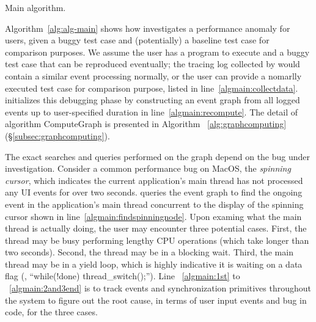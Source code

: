 \begin{algorithm}[ht!]
    \caption{Main \xxx algorithm.}
    \label{alg:alg-main}
\begin{algorithmic}[1]
\Statex
{}
\label{algmain:collectdata}
\label{algmain:recompute}
\label{algmain:findspinningnode}
	\label{algmain:1st}
\Else
	\label{algmain:2and3begin}
		\State {}
	\EndIf\label{algmain:2and3end}
\EndIf
{}
\EndFunction
\end{algorithmic}
\end{algorithm}

Algorithm~\ref{alg:alg-main} shows how \xxx investigates a performance anomaly
for users, given a buggy test case and (potentially) a baseline test case
for comparison purposes. We assume the user has a program to execute and a
buggy test case that can be reproduced eventually; the tracing log collected
by \xxx would contain a similar event processing normally, or the user can
provide a nomarlly executed test case for comparison purpose, listed in
line~\ref{algmain:collectdata}. \xxx initializes this debugging phase by
constructing an event graph from all logged events up to user-specified duration
in line~\ref{algmain:recompute}. The detail of algorithm ComputeGraph is
presented in Algorithm ~\ref{alg:graphcomputing}(\S\ref{subsec:graphcomputing}).

The exact searches and queries performed on the graph depend on the bug under
investigation. Consider a common performance bug on MacOS, the \emph{spinning
cursor}, which indicates the current application's main thread has not processed
any UI events for over two seconds. \xxx queries the event graph to find the
ongoing event in the application's main thread concurrent to the display of
the spinning cursor shown in line~\ref{algmain:findspinningnode}. Upon examing
what the main thread is actually doing, the user may encounter three potential
cases. First, the thread may be busy performing lengthy CPU operations (which
take longer than two seconds). Second, the thread may be in a blocking wait.
Third, the main thread may be in a yield loop, which is highly indicative
it is waiting on a data flag (\eg, ``while(!done) thread\_switch();'').
Line ~\ref{algmain:1st} to ~\ref{algmain:2and3end} is to track events and
synchronization primitives throughout the system to figure out the root cause,
in terms of user input events and bug in code, for the three cases.

